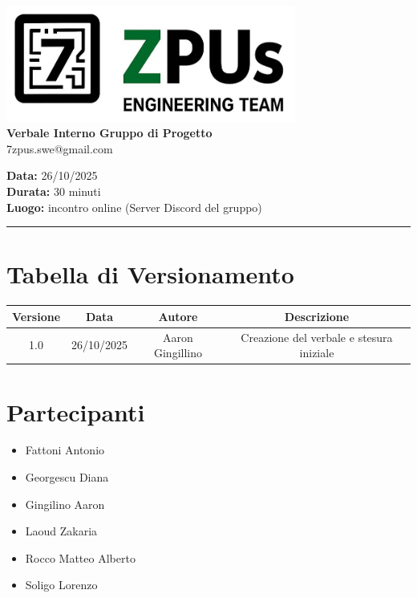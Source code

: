 \documentclass[a4paper,12pt]{article}
\begin{document}
\begin{center}
    \includegraphics[width=9.5cm]{../../../assets/logo7zpus.jpg}\\
    \Large \textbf{Verbale Interno Gruppo di Progetto}\\
    \vspace{0.5cm}
    \small\hspace{10cm} 7zpus.swe@gmail.com
\end{center}

\noindent
\textbf{Data:} 26/10/2025 \\
\textbf{Durata:}  30 minuti\\
\textbf{Luogo:} incontro online (Server Discord del gruppo)

\vspace{0.3cm}
\hrule
\vspace{0.5cm}

\tableofcontents

\newpage

\section{Tabella di Versionamento}
    \begin{tabular}{|c|c|c|c|}
        \hline
        \textbf{Versione} & \textbf{Data} & \textbf{Autore} & \textbf{Descrizione} \\
        \hline
        1.0 & 26/10/2025& Aaron Gingillino& Creazione del verbale e stesura iniziale \\

        \hline
    \end{tabular}


\section{Partecipanti}
\begin{itemize}[noitemsep]
    \item Fattoni Antonio 
    \item Georgescu Diana
    \item Gingilino Aaron
    \item Laoud Zakaria
    \item Rocco Matteo Alberto
    \item Soligo Lorenzo
\end{itemize}
\end{document}
